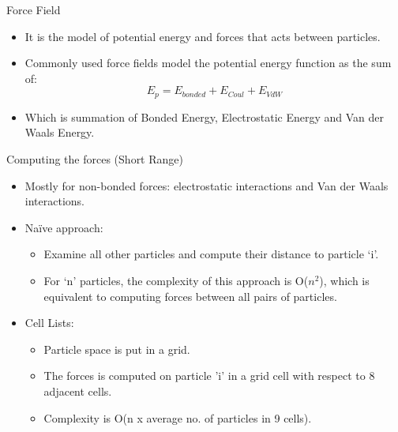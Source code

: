 \documentclass[aspectratio=169]{beamer}
\begin{document}
\begin{frame}[fragile]{Force Field}

\begin{itemize}
\item It is the model of potential energy and forces that acts between particles.
\item Commonly used force fields model the potential energy function as the sum of:
\begin{equation}
E_p = E_{bonded}+E_{Coul}+E_{VdW}
\end{equation}
\item Which is summation of Bonded Energy, Electrostatic Energy and Van der Waals Energy.
\end{itemize}



\end{frame}

\begin{frame}[fragile]{Computing the forces (Short Range)}


\begin{itemize}
\item Mostly for non-bonded forces: electrostatic interactions and Van der Waals interactions.
\item Naïve approach:
\begin{itemize}
\item Examine all other particles and compute their distance to particle ‘i’. 
\item For ‘n’ particles, the complexity of this approach is O($n^2$), which is equivalent to computing forces between all pairs of particles. 
\end{itemize}
\item Cell Lists:
\begin{itemize}
\item Particle space is put in a grid.
\item The forces is computed on particle ’i’ in a grid cell with respect to 8 adjacent cells.
\item Complexity is O(n x average no. of particles in 9 cells).
\end{itemize}
\end{itemize}



\end{frame}
\end{document}
